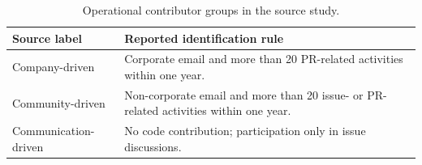 \begin{table}[tbp]
\caption{Operational contributor groups in the source study.}
\label{tab:ch9-groups}
\centering\small\renewcommand{\arraystretch}{1.15}
\begin{tabularx}{\linewidth}{@{}>{\raggedright\arraybackslash}p{31mm}>{\raggedright\arraybackslash}X@{}}\toprule
Source label & Reported identification rule \\\midrule
Company-driven & Corporate email and more than 20 PR-related activities within one year.\\
Community-driven & Non-corporate email and more than 20 issue- or PR-related activities within one year.\\
Communication-driven & No code contribution; participation only in issue discussions.\\\bottomrule
\end{tabularx}
\end{table}
